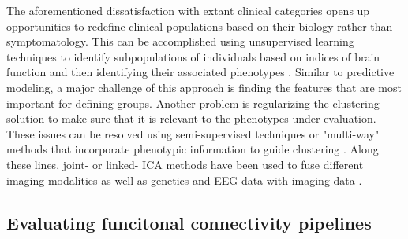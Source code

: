 \documentclass{bmcart}
\begin{document}
The aforementioned dissatisfaction with extant clinical categories opens up opportunities to redefine clinical populations based on their biology rather than symptomatology. This can be accomplished using unsupervised learning techniques to identify subpopulations of individuals based on indices of brain function and then identifying their associated phenotypes \cite{Gates2014}. Similar to predictive modeling, a major challenge of this approach is finding the features that are most important for defining groups. Another problem is regularizing the clustering solution to make sure that it is relevant to the phenotypes under evaluation. These issues can be resolved using semi-supervised techniques or "multi-way" methods that incorporate phenotypic information to guide clustering \cite{Morup2011}. Along these lines, joint- or linked- ICA methods have been used to fuse different imaging modalities \cite{Franco2008, Groves2011} as well as genetics and EEG data with imaging data \cite{Calhoun2009}. 

\subsection{Evaluating funcitonal connectivity pipelines}
\end{document}
